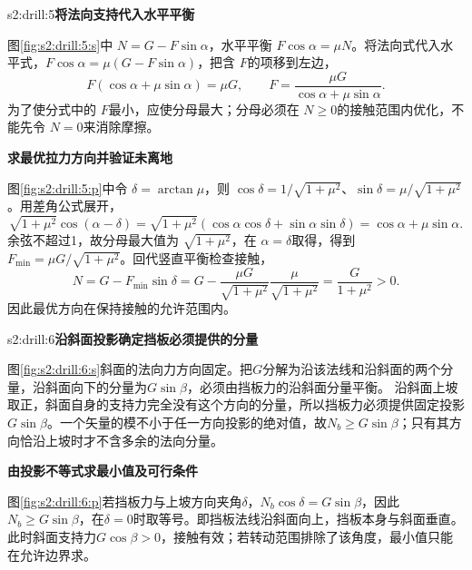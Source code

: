 \begin{drillsolution}{s2:drill:5}\textbf{将法向支持代入水平平衡}\par\nobreak
图\ref{fig:s2:drill:5:s}中 $N=G-F\sin\alpha$，水平平衡 $F\cos\alpha=\mu N$。将法向式代入水平式，$F\cos\alpha=\mu(G-F\sin\alpha)$，把含 $F$的项移到左边，
\[
 F(\cos\alpha+\mu\sin\alpha)=\mu G,
 \qquad F=\frac{\mu G}{\cos\alpha+\mu\sin\alpha}.
\]
为了使分式中的 $F$最小，应使分母最大；分母必须在 $N\ge0$的接触范围内优化，不能先令 $N=0$来消除摩擦。



\par\medskip{}\noindent\textbf{求最优拉力方向并验证未离地}\par\nobreak
图\ref{fig:s2:drill:5:p}中令 $\delta=\arctan\mu$，则 $\cos\delta=1/\sqrt{1+\mu^2}$、$\sin\delta=\mu/\sqrt{1+\mu^2}$。用差角公式展开，
\[
 \sqrt{1+\mu^2}\cos(\alpha-\delta)
 =\sqrt{1+\mu^2}(\cos\alpha\cos\delta+\sin\alpha\sin\delta)
 =\cos\alpha+\mu\sin\alpha.
\]
余弦不超过1，故分母最大值为 $\sqrt{1+\mu^2}$，在 $\alpha=\delta$取得，得到 $F_{\min}=\mu G/\sqrt{1+\mu^2}$。回代竖直平衡检查接触，
\[
 N=G-F_{\min}\sin\delta
 =G-\frac{\mu G}{\sqrt{1+\mu^2}}
       \frac\mu{\sqrt{1+\mu^2}}
 =\frac{G}{1+\mu^2}>0.
\]
因此最优方向在保持接触的允许范围内。\end{drillsolution}
\begin{drillsolution}{s2:drill:6}\textbf{沿斜面投影确定挡板必须提供的分量}\par\nobreak
图\ref{fig:s2:drill:6:s}斜面的法向力方向固定。把$G$分解为沿该法线和沿斜面的两个分量，沿斜面向下的分量为$G\sin\beta$，必须由挡板力的沿斜面分量平衡。
沿斜面上坡取正，斜面自身的支持力完全没有这个方向的分量，所以挡板力必须提供固定投影$G\sin\beta$。一个矢量的模不小于任一方向投影的绝对值，故$N_b\ge G\sin\beta$；只有其方向恰沿上坡时才不含多余的法向分量。



\par\medskip{}\noindent\textbf{由投影不等式求最小值及可行条件}\par\nobreak
图\ref{fig:s2:drill:6:p}若挡板力与上坡方向夹角$\delta$，$N_b\cos\delta=G\sin\beta$，因此$N_b\ge G\sin\beta$，在$\delta=0$时取等号。即挡板法线沿斜面向上，挡板本身与斜面垂直。此时斜面支持力$G\cos\beta>0$，接触有效；若转动范围排除了该角度，最小值只能在允许边界求。\end{drillsolution}
